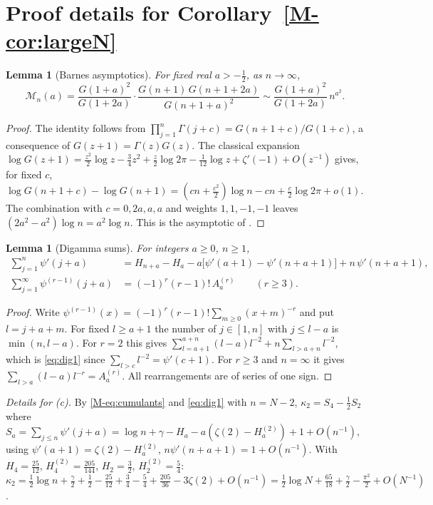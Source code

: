 \documentclass[12pt]{amsart}
\newtheorem{lemma}[theorem]{Lemma}
\theoremstyle{remark}
\newcommand{\1}{\mathbf{1}}
\begin{document}
\section{Proof details for Corollary~\ref{M-cor:largeN}}\label{sec:largeNsupp}

\begin{lemma}[Barnes asymptotics]\label{lem:barnes}
For fixed real $a>-\frac12$, as $n\to\infty$,
\[
\mathcal M_n(a)=\frac{G(1+a)^2}{G(1+2a)}\cdot
\frac{G(n+1)\,G(n+1+2a)}{G(n+1+a)^2}\sim\frac{G(1+a)^2}{G(1+2a)}\,n^{a^2}.
\]
\end{lemma}

\begin{proof}
The identity follows from $\prod_{j=1}^n\Gamma(j+c)=G(n+1+c)/G(1+c)$,
a consequence of $G(z+1)=\Gamma(z)G(z)$. The classical expansion
$\log G(z+1)=\frac{z^2}2\log z-\frac34z^2+\frac z2\log2\pi
-\frac1{12}\log z+\zeta'(-1)+O(z^{-1})$ \cite{Bar00} gives, for fixed $c$,
$\log G(n+1+c)-\log G(n+1)=(cn+\frac{c^2}2)\log n-cn+\frac c2\log2\pi+o(1)$.
The combination with $c=0,2a,a,a$ and weights $1,1,-1,-1$ leaves
$(2a^2-a^2)\log n=a^2\log n$. This is the asymptotic of \cite{KS00}.
\end{proof}

\begin{lemma}[Digamma sums]\label{lem:digamma}
For integers $a\ge0$, $n\ge1$,
\begin{align}
\sum_{j=1}^n\psi'(j+a)&=H_{n+a}-H_a-a\big[\psi'(a+1)-\psi'(n+a+1)\big]
+n\,\psi'(n+a+1),\label{eq:dig1}\\
\sum_{j=1}^\infty\psi^{(r-1)}(j+a)&=(-1)^r(r-1)!\,A_a^{(r)}\qquad(r\ge3).
\label{eq:dig2}
\end{align}
\end{lemma}

\begin{proof}
Write $\psi^{(r-1)}(x)=(-1)^r(r-1)!\sum_{m\ge0}(x+m)^{-r}$ and put
$l=j+a+m$. For fixed $l\ge a+1$ the number of $j\in[1,n]$ with $j\le l-a$
is $\min(n,l-a)$. For $r=2$ this gives
$\sum_{l=a+1}^{a+n}(l-a)l^{-2}+n\sum_{l>a+n}l^{-2}$, which is
\eqref{eq:dig1} since $\sum_{l>c}l^{-2}=\psi'(c+1)$. For $r\ge3$ and
$n=\infty$ it gives $\sum_{l>a}(l-a)l^{-r}=A_a^{(r)}$. All rearrangements
are of series of one sign.
\end{proof}

\emph{Details for (c).} By \eqref{M-eq:cumulants} and \eqref{eq:dig1}
with $n=N-2$, $\kappa_2=S_4-\frac12S_2$ where $S_a=\sum_{j\le n}\psi'(j+a)
=\log n+\gamma-H_a-a(\zeta(2)-H_a^{(2)})+1+O(n^{-1})$, using
$\psi'(a+1)=\zeta(2)-H_a^{(2)}$, $n\psi'(n+a+1)=1+O(n^{-1})$. With
$H_4=\frac{25}{12}$, $H_4^{(2)}=\frac{205}{144}$, $H_2=\frac32$,
$H_2^{(2)}=\frac54$:
$\kappa_2=\frac12\log n+\frac\gamma2+\frac12-\frac{25}{12}+\frac34
-\frac54+\frac{205}{36}-3\zeta(2)+O(n^{-1})
=\frac12\log N+\frac{65}{18}+\frac\gamma2-\frac{\pi^2}2+O(N^{-1})$.
\end{document}
